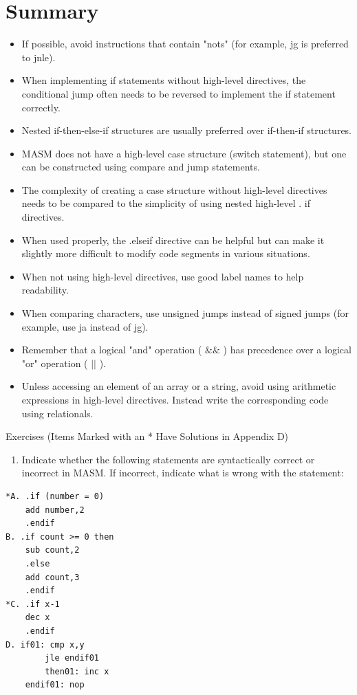 \documentclass[10pt]{book}
\begin{document}
\section{Summary}
\begin{itemize}
  \item If possible, avoid instructions that contain "nots" (for example, jg is preferred to jnle).
  \item When implementing if statements without high-level directives, the conditional jump often needs to be reversed to implement the if statement correctly.
  \item Nested if-then-else-if structures are usually preferred over if-then-if structures.
  \item MASM does not have a high-level case structure (switch statement), but one can be constructed using compare and jump statements.
  \item The complexity of creating a case structure without high-level directives needs to be compared to the simplicity of using nested high-level . if directives.
  \item When used properly, the .elseif directive can be helpful but can make it slightly more difficult to modify code segments in various situations.
  \item When not using high-level directives, use good label names to help readability.
  \item When comparing characters, use unsigned jumps instead of signed jumps (for example, use ja instead of jg).
  \item Remember that a logical "and" operation ( $\& \&$ ) has precedence over a logical "or" operation ( $|\mid$ ).
  \item Unless accessing an element of an array or a string, avoid using arithmetic expressions in high-level directives. Instead write the corresponding code using relationals.
\end{itemize}


Exercises (Items Marked with an * Have Solutions in Appendix D)
\begin{enumerate}
  \item Indicate whether the following statements are syntactically correct or incorrect in MASM. If incorrect, indicate what is wrong with the statement:
\end{enumerate}

\begin{verbatim}
*A. .if (number = 0)
    add number,2
    .endif
B. .if count >= 0 then
    sub count,2
    .else
    add count,3
    .endif
*C. .if x-1
    dec x
    .endif
D. if01: cmp x,y
        jle endif01
        then01: inc x
    endif01: nop
\end{verbatim}
\end{document}
